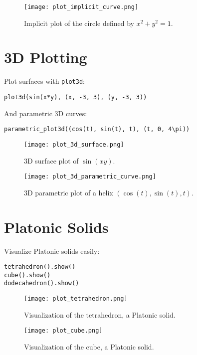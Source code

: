 \documentclass[12pt]{book}
\begin{document}
\begin{figure}[H]
  \centering
  \texttt{[image: plot\_implicit\_curve.png]}
  \caption{Implicit plot of the circle defined by \( x^2 + y^2 = 1 \).}
  \label{fig:plot_implicit_curve}
\end{figure}

\section{3D Plotting}

Plot surfaces with \texttt{plot3d}:

\begin{verbatim}
plot3d(sin(x*y), (x, -3, 3), (y, -3, 3))
\end{verbatim}

And parametric 3D curves:

\begin{verbatim}
parametric_plot3d((cos(t), sin(t), t), (t, 0, 4\pi))
\end{verbatim}

\begin{figure}[H]
  \centering
  \texttt{[image: plot\_3d\_surface.png]}
  \caption{3D surface plot of \( \sin(x y) \).}
  \label{fig:plot_3d_surface}
\end{figure}

\begin{figure}[H]
  \centering
  \texttt{[image: plot\_3d\_parametric\_curve.png]}
  \caption{3D parametric plot of a helix \( ( \cos(t), \sin(t), t ) \).}
  \label{fig:plot_3d_parametric_curve}
\end{figure}

\section{Platonic Solids}

Visualize Platonic solids easily:

\begin{verbatim}
tetrahedron().show()
cube().show()
dodecahedron().show()
\end{verbatim}

\begin{figure}[H]
  \centering
  \texttt{[image: plot\_tetrahedron.png]}
  \caption{Visualization of the tetrahedron, a Platonic solid.}
  \label{fig:plot_tetrahedron}
\end{figure}

\begin{figure}[H]
  \centering
  \texttt{[image: plot\_cube.png]}
  \caption{Visualization of the cube, a Platonic solid.}
  \label{fig:plot_cube}
\end{figure}
\end{document}
